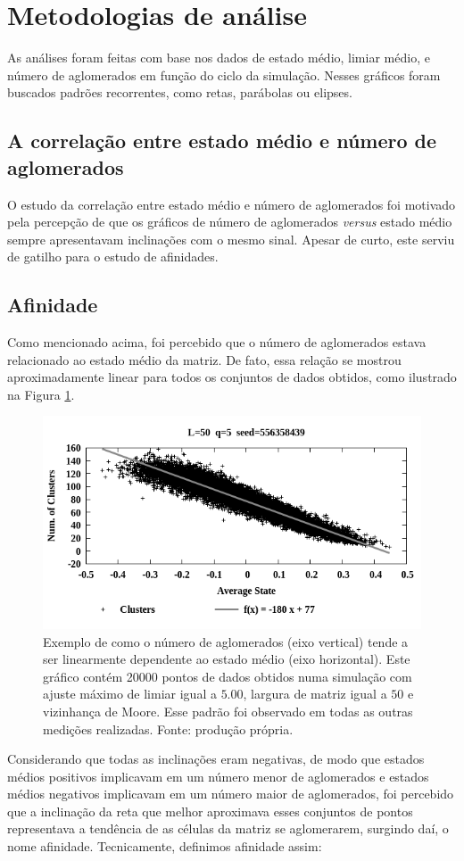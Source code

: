 \documentclass[
	12pt,				%
	openright,			%
	twoside,			%
	a4paper,			%
	english,			%
	french,				%
	spanish,			%
	brazil				%
	]{abntex2}
\begin{document}
\section{Metodologias de análise}

As análises foram feitas com base nos dados de estado médio, limiar médio, e número de aglomerados em função do ciclo da simulação. Nesses gráficos foram buscados padrões recorrentes, como retas, parábolas ou elipses.

\subsection{A correlação entre estado médio e número de aglomerados}

O estudo da correlação entre estado médio e número de aglomerados foi motivado pela percepção de que os gráficos de número de aglomerados \textit{versus} estado médio sempre apresentavam inclinações com o mesmo sinal. Apesar de curto, este serviu de gatilho para o estudo de afinidades.

\subsection{Afinidade}

Como mencionado acima, foi percebido que o número de aglomerados estava relacionado ao estado médio da matriz. De fato, essa relação se mostrou aproximadamente linear para todos os conjuntos de dados obtidos, como ilustrado na Figura \ref{fig:exemploAfinidade}. 
\begin{figure}[h]
    \centering
    \includegraphics[width=.75\linewidth]{ICA-L50-q5_0-seed556358439-ClusterVsAvgState.png}
    \caption{Exemplo de como o número de aglomerados (eixo vertical) tende a ser linearmente dependente ao estado médio (eixo horizontal). Este gráfico contém 20000 pontos de dados obtidos numa simulação com ajuste máximo de limiar igual a $5.00$, largura de matriz igual a $50$ e vizinhança de Moore. Esse padrão foi observado em todas as outras medições realizadas. Fonte: produção própria.}
    \label{fig:exemploAfinidade}
\end{figure}
Considerando que todas as inclinações eram negativas, de modo que estados médios positivos implicavam em um número menor de aglomerados e estados médios negativos implicavam em um número maior de aglomerados, foi percebido que a inclinação da reta que melhor aproximava esses conjuntos de pontos representava a tendência de as células da matriz se aglomerarem, surgindo daí, o nome afinidade. Tecnicamente, definimos afinidade assim:
\end{document}
